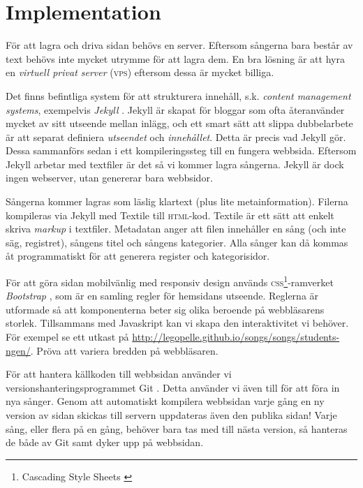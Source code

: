 \section{Implementation}

För att lagra och driva sidan behövs en server. Eftersom sångerna bara består av text behövs inte mycket utrymme för att lagra dem. En bra lösning är att hyra en \emph{virtuell privat server} (\textsc{vps}) eftersom dessa är mycket billiga.

Det finns befintliga system för att strukturera innehåll, s.k. \emph{content management systems}, exempelvis \emph{Jekyll} \cite{jekyll}. Jekyll är skapat för bloggar som ofta återanvänder mycket av sitt utseende mellan inlägg, och ett smart sätt att slippa dubbelarbete är att separat definiera \emph{utseendet} och \emph{innehållet}. Detta är precis vad Jekyll gör. Dessa sammanförs sedan i ett kompileringssteg till en fungera webbsida. Eftersom Jekyll arbetar med textfiler är det så vi kommer lagra sångerna. Jekyll är dock ingen webserver, utan genererar bara webbsidor.

Sångerna kommer lagras som läslig klartext (plus lite metainformation). Filerna kompileras via Jekyll med Textile \cite{textile} till \textsc{html}-kod. Textile är ett sätt att enkelt skriva \emph{markup} i textfiler. Metadatan anger att filen innehåller en sång (och inte säg, registret), sångens titel och sångens kategorier. Alla sånger kan då kommas åt programmatiskt för att generera register och kategorisidor.
 
För att göra sidan mobilvänlig med responsiv design används \textsc{css}\footnote{Cascading Style Sheets \cite{css}}-ramverket \emph{Bootstrap} \cite{boot}, som är en samling regler för hemsidans utseende. Reglerna är utformade så att komponenterna beter sig olika beroende på webbläsarens storlek. Tillsammans med Javaskript kan vi skapa den interaktivitet vi behöver. För exempel se ett utkast på \url{http://legopelle.github.io/songs/songs/students-ngen/}. Pröva att variera bredden på webbläsaren.

För att hantera källkoden till webbsidan använder vi versionshanteringsprogrammet Git \cite{git}. Detta använder vi även till för att föra in nya sånger. Genom att automatiskt kompilera webbsidan varje gång en ny version av sidan skickas till servern uppdateras även den publika sidan! Varje sång, eller flera på en gång, behöver bara tas med till nästa version, så hanteras de både av Git samt dyker upp på webbsidan.

